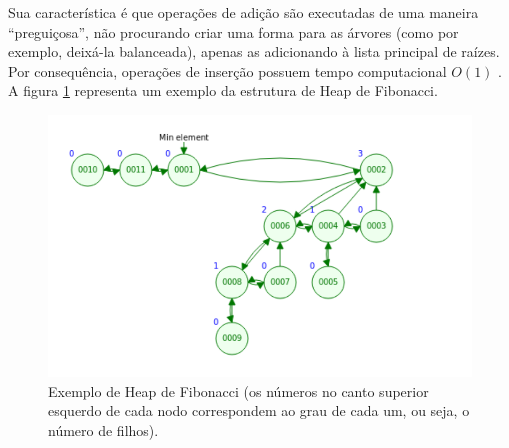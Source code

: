 Sua característica é que operações de adição são executadas de uma maneira ``preguiçosa'', não procurando criar uma forma para as árvores (como por exemplo, deixá-la balanceada), apenas as adicionando à lista principal de raízes. Por consequência, operações de inserção possuem tempo computacional $O(1)$ \cite{cormen2009introduction}. A figura \ref{fig-dijkstra-heapfibonacci1} representa um exemplo da estrutura de Heap de Fibonacci.

\begin{figure}[H]
\centering
\includegraphics[width=.54\textwidth]{figuras/fibonacci-heap1} 
\caption{Exemplo de Heap de Fibonacci (os números no canto superior esquerdo de cada nodo correspondem ao grau de cada um, ou seja, o número de filhos).}
\label{fig-dijkstra-heapfibonacci1}
\end{figure}

